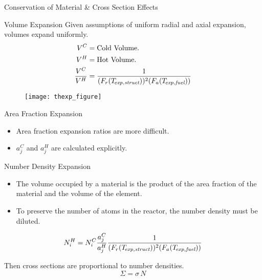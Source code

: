 \begin{frame}{Conservation of Material \& Cross Section Effects}
\end{frame}

\begin{frame}{Volume Expansion}
  Given assumptions of uniform radial and axial expansion, volumes expand
  uniformly.
  \begin{align}
    \label{eq:volume_ratio}
    V^C &= \text{Cold Volume.}\\
    V^H &= \text{Hot Volume.}\\
    \frac{V^C}{V^H} &= \frac{1}{(F_r(T_{\!\mbox{\scriptsize \em exp,struct}}))^2 (F_a({T_{\!\mbox{\scriptsize \em exp,fuel}}}))}
  \end{align}
  \vspace{-0.1in}
  \begin{figure}
    \centering
    \texttt{[image: thexp\_figure]}
    \label{fig:thexp_figure}
  \end{figure}
\end{frame}

\begin{frame}{Area Fraction Expansion}
  \begin{itemize}
    \item Area fraction expansion ratios are more difficult.
    \item $a_j^C$ and $a_j^H$ are calculated explicitly.
  \end{itemize}

  \begin{figure}
    \centering
    \hspace{0.2in}
    \label{fig:assy_geometry}
  \end{figure}
\end{frame}

\begin{frame}{Number Density Expansion}
  \begin{itemize}
    \item The volume occupied by a material is the product of the 
      area fraction of the material and the volume of the element.
    \item To preserve the number of atoms in the reactor, the number density 
      must be diluted.
  \end{itemize}
  \begin{equation}
    \label{eq:nden_thexp_update}
    N_i^H = N_i^C \frac{a_j^C}{a_j^H} 
      \frac{1}{(F_r(T_{\!\mbox{\scriptsize \em exp,struct}}))^2 (F_a({T_{\!\mbox{\scriptsize \em exp,fuel}}}))}
  \end{equation}

  Then cross sections are proportional to number densities.
  \begin{equation}
    \Sigma = \sigma \, N
  \end{equation}
\end{frame}


